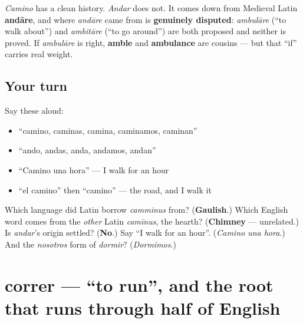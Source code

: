 \begin{culture}
\emph{Camino} has a clean history. \emph{Andar} does not. It comes down from Medieval Latin \textbf{andāre}, and where \emph{andāre} came from is \textbf{genuinely disputed}: \emph{ambulāre} (\textquotedblleft{}to walk about\textquotedblright{}) and \emph{ambitāre} (\textquotedblleft{}to go around\textquotedblright{}) are both proposed and neither is proved. If \emph{ambulāre} is right, \textbf{amble} and \textbf{ambulance} are cousins — but that \textquotedblleft{}if\textquotedblright{} carries real weight.
\end{culture}

\subsection*{Your turn}
Say these aloud:

\begin{itemize}
\raggedright
  \item \textquotedblleft{}camino, caminas, camina, caminamos, caminan\textquotedblright{}
  \item \textquotedblleft{}ando, andas, anda, andamos, andan\textquotedblright{}
  \item \textquotedblleft{}Camino una hora\textquotedblright{} — I walk for an hour
  \item \textquotedblleft{}el camino\textquotedblright{} then \textquotedblleft{}camino\textquotedblright{} — the road, and I walk it
\end{itemize}

\begin{tcolorbox}[breakable,colback=teal!4,colframe=teal!35!black,title={Before you move on}]
Which language did Latin borrow \emph{camminus} from? (\textbf{Gaulish}.) Which English word comes from the \emph{other} Latin \emph{camīnus}, the hearth? (\textbf{Chimney} — unrelated.) Is \emph{andar}'s origin settled? (\textbf{No}.) Say \textquotedblleft{}I walk for an hour\textquotedblright{}. (\emph{Camino una hora}.) And the \emph{nosotros} form of \emph{dormir}? (\emph{Dormimos}.)
\end{tcolorbox}
\section[correr]{correr — \textquotedblleft{}to run\textquotedblright{}, and the root that runs through half of English}

\label{lesson:ES-C36-correr}




